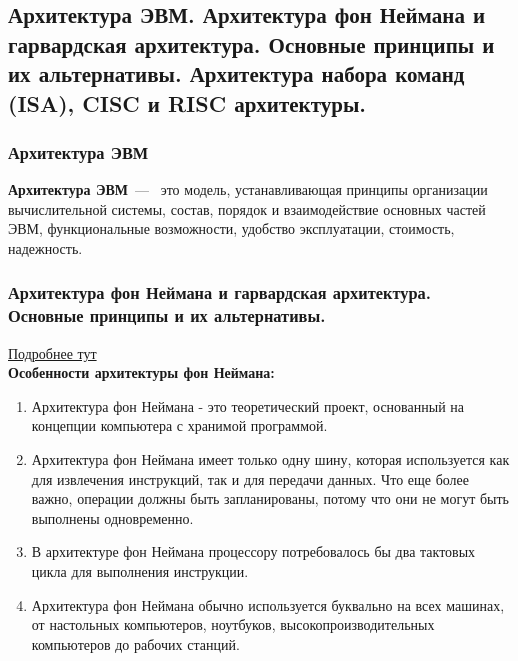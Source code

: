 \documentclass{article}
\begin{document}
\subsection{Архитектура ЭВМ. Архитектура фон Неймана и гарвардская архитектура. Основные принципы и их альтернативы. Архитектура набора команд (ISA), CISC и RISC архитектуры.}

\subsubsection{Архитектура ЭВМ}
\textbf{Архитектура ЭВМ}~---~
это модель, устанавливающая принципы организации вычислительной системы, состав, 
порядок и взаимодействие основных частей ЭВМ, функциональные возможности, 
удобство эксплуатации, стоимость, надежность.

\subsubsection{Архитектура фон Неймана и гарвардская архитектура. Основные принципы и их альтернативы.}


\href{https://www.currentschoolnews.com/ru/%D0%BD%D0%BE%D0%B2%D0%BE%D1%81%D1%82%D0%B8-%D0%BE%D0%B1%D1%80%D0%B0%D0%B7%D0%BE%D0%B2%D0%B0%D0%BD%D0%B8%D1%8F/%D0%A0%D0%B0%D0%B7%D0%BD%D0%B8%D1%86%D0%B0-%D0%BC%D0%B5%D0%B6%D0%B4%D1%83-%D1%84%D0%BE%D0%BD-%D0%9D%D0%B5%D0%B9%D0%BC%D0%B0%D0%BD%D0%B0-%D0%B8-%D0%93%D0%B0%D1%80%D0%B2%D0%B0%D1%80%D0%B4%D1%81%D0%BA%D0%BE%D0%B9-%D0%B0%D1%80%D1%85%D0%B8%D1%82%D0%B5%D0%BA%D1%82%D1%83%D1%80%D1%8B/}{Подробнее тут}
\\

\textbf{Особенности архитектуры фон Неймана:}
\begin{enumerate}
	\item Архитектура фон Неймана - это теоретический проект, основанный на концепции компьютера с хранимой программой.
	\item Архитектура фон Неймана имеет только одну шину, которая используется как для извлечения инструкций, так и для передачи данных. Что еще более важно, операции должны быть запланированы, потому что они не могут быть выполнены одновременно.
	\item В архитектуре фон Неймана процессору потребовалось бы два тактовых цикла для выполнения инструкции.
	\item Архитектура фон Неймана обычно используется буквально на всех машинах, от настольных компьютеров, ноутбуков, высокопроизводительных компьютеров до рабочих станций.
\end{enumerate}
\end{document}

